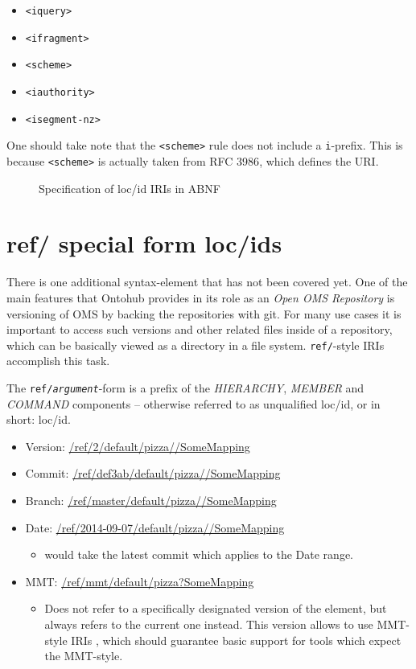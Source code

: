 \documentclass[10pt,fleqn,final]{scrreprt}
\begin{document}
\begin{itemize}
  \item \texttt{<iquery>}
  \item \texttt{<ifragment>}
  \item \texttt{<scheme>}
  \item \texttt{<iauthority>}
  \item \texttt{<isegment-nz>}
\end{itemize}

One should take note that the \texttt{<scheme>} rule does not include a
\texttt{i}-prefix.  This is because \texttt{<scheme>} is actually taken from
RFC 3986\cite{rfc3986}, which defines the URI.

\begin{figure}[b]
  \centering
  
  \caption[loc/id specification in ABNF]
   {Specification of loc/id IRIs in ABNF}
  \label{lst:loc-id-spec}
\end{figure}

\clearpage
\section{ref/ special form loc/ids}

There is one additional syntax-element that has not been covered yet. One of the
main features that Ontohub provides in its role as an \emph{Open OMS Repository}
is versioning of OMS by backing the repositories with git. For many use cases it is 
important to access such versions and other related files inside of a
repository, which can be basically viewed as a directory in a file system.
\texttt{ref/}-style IRIs accomplish this task.

The \texttt{ref/\emph{argument}}-form is a prefix of the \emph{HIERARCHY},
\emph{MEMBER} and \emph{COMMAND} components -- otherwise referred to as
unqualified loc/id, or in short: loc/id.

\begin{itemize}
  \item Version: \url{/ref/2/default/pizza//SomeMapping}
  \item Commit: \url{/ref/def3ab/default/pizza//SomeMapping}
  \item Branch: \url{/ref/master/default/pizza//SomeMapping}
  \item Date: \url{/ref/2014-09-07/default/pizza//SomeMapping}
    \begin{itemize}
      \item would take the latest commit which applies to the Date range.
    \end{itemize}
  \item MMT: \url{/ref/mmt/default/pizza?SomeMapping}
    \begin{itemize}
      \item Does not refer to a specifically designated version of the element,
        but always refers to the current one instead. This version allows to
        use MMT-style IRIs \cite{RabKoh:WSMSML13}, 
        which should guarantee basic support for tools
        which expect the MMT-style.
    \end{itemize}
\end{itemize}
\end{document}
